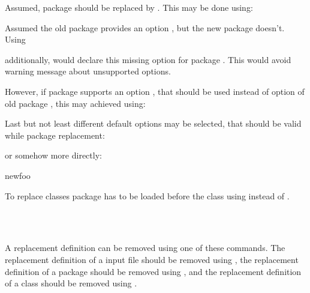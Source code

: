 \begin{Example}
  Assumed, package  should be replaced by
  . This may be done using:
\begin{lstcode}
\end{lstcode}
  Assumed the old package provides an option , but the new
  package doesn't. Using
\begin{lstcode}
\end{lstcode}
  additionally, would declare this missing option for package
  . This would avoid warning message about unsupported
  options.

  However, if package  supports an option ,
  that should be used instead of option  of old package
  , this may achieved using:
\begin{lstcode}
\end{lstcode}
  Last but not least different default options may be selected, that should be
  valid while package replacement:
\begin{lstcode}
\end{lstcode}
  or somehow more directly:
\begin{lstcode}
                       {newfoo}%
\end{lstcode}
\end{Example}

To replace classes package  has to be loaded before the
class using  instead of .
%
%
%

\begin{Declaration}
  \\
  \\
\end{Declaration}
%
%
%
A replacement definition can be removed
using one of these commands. The replacement definition of a input file should
be removed using , the replacement definition of a
package should be removed using , and the replacement
definition of a class should be removed using .%
%
%
%


